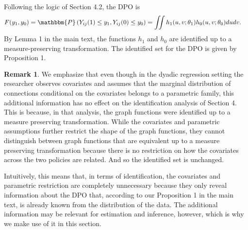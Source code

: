 \documentclass[12pt]{article}
\theoremstyle{definition}
\newtheorem{remark}{Remark}
\begin{document}
{Following the logic of Section 4.2, the DPO is
\begin{align*}
F(y_1,y_0) &= \mathbbm{P}\left(Y_{ij}(1) \leq y_1, Y_{ij}(0) \leq y_0\right) 
= \iint h_1(u,v;\theta _1)h_0(u,v;\theta _0)dudv.
\end{align*}
By Lemma 1 in the main text, the functions $h_1$ and $h_0$ are identified up to a measure-preserving transformation. The identified set for the DPO is given by Proposition 1.  

\begin{remark}
We emphasize that even though in the dyadic regression setting the researcher observes covariates and assumes that the marginal distribution of connections conditional on the covariates belongs to a parametric family, this additional information has no effect on the identification analysis of Section 4. This is because, in that analysis, the graph functions were identified up to a measure preserving transformation. While the covariates and parametric assumptions further restrict the shape of the graph functions, they cannot distinguish between graph functions that are equivalent up to a measure preserving transformation because there is no restriction on how the covariates across the two policies are related. And so the identified set is unchanged.  

Intuitively, this means that, in terms of identification, the covariates and parametric restriction are completely unnecessary because they only reveal information about the DPO that, according to our Proposition 1 in the main text, is already known from the distribution of the data. The additional information may be relevant for estimation and inference, however, which is why we make use of it in this section.  
\end{remark}


}
\end{document}
